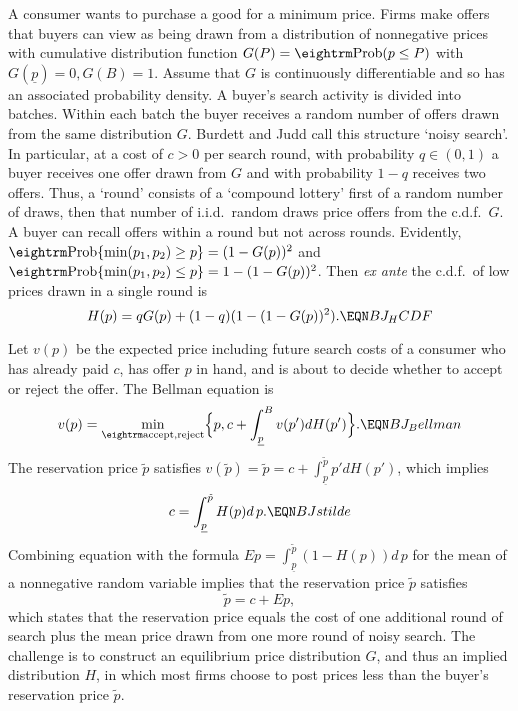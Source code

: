A consumer wants to purchase a good  for a minimum price. Firms make offers that buyers can view as being drawn from a distribution of nonnegative prices
with cumulative distribution function $G(P) = {\rm Prob} (p \leq P)$ with $G(\underline p ) = 0, G(B) = 1$. Assume that $G$ is continuously differentiable and so has an associated probability density.   A buyer's
 search activity is divided into batches.  Within each batch the buyer receives a random number of offers drawn from the same distribution $G$.
 Burdett and Judd call
 this structure `noisy search'.
 In particular, at a cost of $c>0$ per search round, with
probability $q \in (0,1)$ a buyer receives one offer drawn from $G$  and with probability $1-q$ receives two offers.  Thus, a `round'
consists of a `compound lottery' first of a random number of draws, then  that number of i.i.d.\ random draws price offers from the c.d.f.\ $G$.  A buyer
can  recall
 offers within a round but not across rounds.
Evidently, ${\rm Prob} \{\min (p_1, p_2) \geq p\} = (1-G(p))^2$ and $
{\rm Prob}\{\min (p_1,p_2) \leq p \} = 1 - (1-G(p))^2 $.  Then {\it ex ante\/} the c.d.f.\ of low prices drawn in a single round is
$$ H(p) = q G(p) + (1-q) (1 - (1-G(p))^2 ) .  \EQN BJ_HCDF $$

Let $v(p)$ be the expected price including future search costs of a consumer who has already paid $c$, has offer $p$ in hand, and is
about to decide whether to accept or reject the offer. The Bellman equation is
$$ v(p) = \min_{\rm accept, reject} \Bigl\{ p, c + \int_{\underline p}^B v(p') d H (p')    \Bigr\} . \EQN BJ_Bellman $$
The reservation price $\tilde p$ satisfies $v(\tilde p) = \tilde p = c + \int_{\underline p}^{\tilde p} p' d H(p') $,
which implies
$$ c = \int_{\underline p}^{\tilde p}  H(p) d \, p .  \EQN BJstilde $$
Combining equation  with the formula $E p = \int_{\underline p}^{\tilde p} (1-H(p)) d \, p $ for the mean of a nonnegative random variable implies
that the reservation price $\tilde p$ satisfies
$$ \tilde p = c + E p, $$
which states that the reservation price equals the cost of one additional round of  search plus the mean  price drawn from  one more round of noisy search.
The challenge is to construct an equilibrium price distribution $G$, and thus an implied distribution $H$,
in which most firms choose to post prices less than the buyer's reservation price $\tilde p$.
